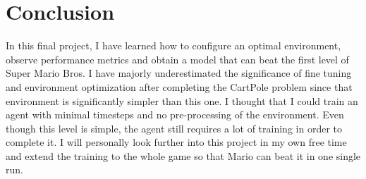 \documentclass{article}
\numberwithin{equation}{section}
\numberwithin{equation}{section}
\begin{document}
\section*{Conclusion}
In this final project, I have learned how to configure an optimal environment, observe performance metrics and obtain a model that can beat the first level of Super Mario Bros. I have majorly underestimated the significance of fine tuning and environment optimization after completing the CartPole problem since that environment is significantly simpler than this one. I thought that I could train an agent with minimal timesteps and no pre-processing of the environment. Even though this level is simple, the agent still requires a lot of training in order to complete it. I will personally look further into this project in my own free time and extend the training to the whole game so that Mario can beat it in one single run.  

\end{document}
